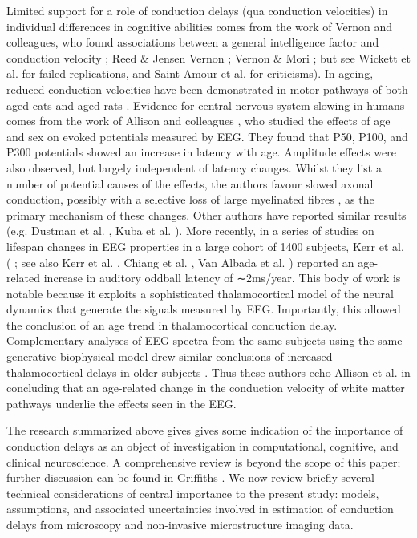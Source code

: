 Limited support for a role of conduction delays (qua conduction velocities) in individual differences in cognitive abilities comes from the work of Vernon and colleagues, who found associations between a general intelligence factor and conduction velocity  \cite{mcrorie2004synaptic,reed2004confirmation}; Reed \& Jensen \cite{reed1991arm,reed1992conduction,reed1993a}
Vernon \cite{vernon1983speed}; Vernon \& Mori \cite{vernon1992intelligence} ; but see Wickett et al. \cite{wickett1994peripheral} for failed replications, and Saint-Amour et al. \cite{saintamour2005can} for criticisms). In ageing, reduced conduction velocities have been demonstrated in motor pathways of both aged cats \cite{morales1987basic,xi1999changes} and aged rats \cite{astonjones1980brain}. Evidence for central nervous system slowing in humans comes from the work of Allison and colleagues \cite{allison1984developmental,allison1983brain}, who studied the effects of age and sex on evoked potentials measured by EEG. They found that P50, P100, and P300 potentials showed an increase in latency with age.  Amplitude effects were also observed, but largely independent of latency changes. Whilst they list a number of potential causes of the effects, the authors favour slowed axonal conduction, possibly with a selective loss of large myelinated fibres \cite{morrison1990aging}, as the primary mechanism of these changes. Other authors have reported similar results (e.g. Dustman et al. \cite{dustman1990age}, Kuba et al. \cite{kuba2012aging}). More recently, in a series of studies on lifespan changes in EEG properties in a large cohort of 1400 subjects, Kerr et al. (\cite{kerr2010age} 
; see also Kerr et al. \cite{kerr2011modelbased}, Chiang et al. \cite{chiang2011age}, Van Albada et al. \cite{vanalbada2010neurophysiological}) reported an age-related increase in auditory oddball latency of ∼2ms/year. This body of work is notable because it exploits a sophisticated thalamocortical model of the neural dynamics that generate the signals measured by EEG. Importantly, this allowed the conclusion of an age trend in thalamocortical conduction delay. Complementary analyses of EEG spectra from the same subjects using the same generative biophysical model drew similar conclusions of increased thalamocortical delays in older subjects \cite{vanalbada2010neurophysiological}. Thus these authors echo Allison et al.  \cite{allison1984developmental} in concluding that an age-related change in the conduction velocity of white matter pathways underlie the effects seen in the EEG. 

The research summarized above gives gives some indication of the importance of conduction delays as an object of investigation in computational, cognitive, and clinical neuroscience. A comprehensive review is beyond the scope of this paper; further discussion can be found in Griffiths \cite{griffiths2014the}. We now review briefly several technical considerations of central importance to the present study: models, assumptions, and associated uncertainties involved in estimation of conduction delays from microscopy and non-invasive microstructure imaging data.